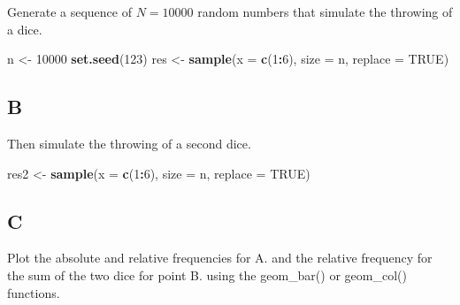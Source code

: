 \documentclass[
]{article}
\newenvironment{Shaded}{\begin{snugshade}}{\end{snugshade}}
\newcommand{\DataTypeTok}[1]{\textcolor[rgb]{0.13,0.29,0.53}{#1}}
\newcommand{\DecValTok}[1]{\textcolor[rgb]{0.00,0.00,0.81}{#1}}
\newcommand{\KeywordTok}[1]{\textcolor[rgb]{0.13,0.29,0.53}{\textbf{#1}}}
\newcommand{\NormalTok}[1]{#1}
\newcommand{\OperatorTok}[1]{\textcolor[rgb]{0.81,0.36,0.00}{\textbf{#1}}}
\newcommand{\OtherTok}[1]{\textcolor[rgb]{0.56,0.35,0.01}{#1}}
\newcommand{\StringTok}[1]{\textcolor[rgb]{0.31,0.60,0.02}{#1}}
\begin{document}
Generate a sequence of \(N=10000\) random numbers that simulate the
throwing of a dice.

\begin{Shaded}
\begin{Highlighting}[]
\NormalTok{n \textless{}{-}}\StringTok{ }\DecValTok{10000}
\KeywordTok{set.seed}\NormalTok{(}\DecValTok{123}\NormalTok{)}
\NormalTok{res \textless{}{-}}\StringTok{ }\KeywordTok{sample}\NormalTok{(}\DataTypeTok{x =} \KeywordTok{c}\NormalTok{(}\DecValTok{1}\OperatorTok{:}\DecValTok{6}\NormalTok{), }\DataTypeTok{size =}\NormalTok{ n, }\DataTypeTok{replace =} \OtherTok{TRUE}\NormalTok{)}
\end{Highlighting}
\end{Shaded}

\hypertarget{b-3}{%
\subsection{B}\label{b-3}}

Then simulate the throwing of a second dice.

\begin{Shaded}
\begin{Highlighting}[]
\NormalTok{res2 \textless{}{-}}\StringTok{ }\KeywordTok{sample}\NormalTok{(}\DataTypeTok{x =} \KeywordTok{c}\NormalTok{(}\DecValTok{1}\OperatorTok{:}\DecValTok{6}\NormalTok{), }\DataTypeTok{size =}\NormalTok{ n, }\DataTypeTok{replace =} \OtherTok{TRUE}\NormalTok{)}
\end{Highlighting}
\end{Shaded}

\hypertarget{c-2}{%
\subsection{C}\label{c-2}}

Plot the absolute and relative frequencies for A. and the relative
frequency for the sum of the two dice for point B. using the geom\_bar()
or geom\_col() functions.
\end{document}
